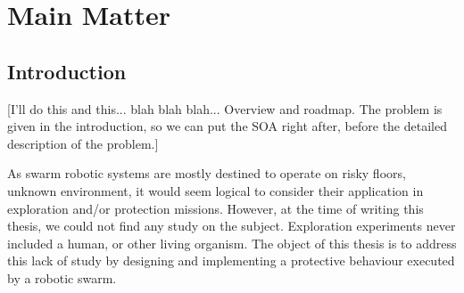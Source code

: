 \documentclass[oneside, a4paper, 12pt]{memoir}
\begin{document}
\tableofcontents
\listoffigures
\listoftables


\part*{Main Matter}
\mainmatter
\chapter{Introduction}

[I'll do this and this... blah blah blah... Overview and roadmap. The problem is given in the introduction, so we can put the SOA right after, before the detailed description of the problem.]

As swarm robotic systems are mostly destined to operate on risky floors, unknown environment, it would seem logical to consider their application in exploration and/or protection missions. However, at the time of writing this thesis, we could not find any study on the subject. Exploration experiments never included a human, or other living organism. The object of this thesis is to address this lack of study by designing and implementing a protective behaviour executed by a robotic swarm.
	
\end{document}
